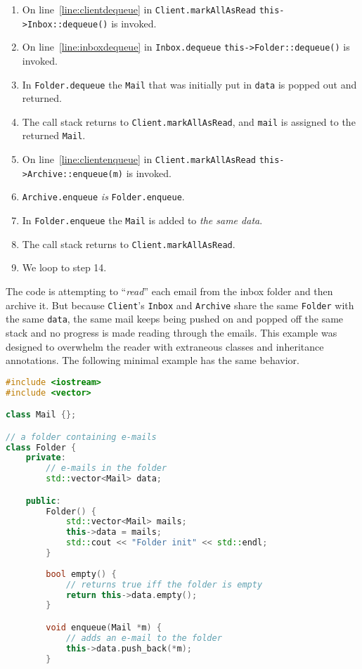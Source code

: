 \documentclass{article}
\begin{document}
\begin{example}
\begin{enumerate}
  \item On line~\ref{line:clientdequeue} in \texttt{Client.markAllAsRead} \texttt{this->Inbox::dequeue()} is invoked.
  \item On line~\ref{line:inboxdequeue} in \texttt{Inbox.dequeue} \texttt{this->Folder::dequeue()} is invoked.
  \item In \texttt{Folder.dequeue} the \texttt{Mail} that was initially put in \texttt{data} is popped out and returned.
  \item The call stack returns to \texttt{Client.markAllAsRead}, and \texttt{mail} is assigned to the returned \texttt{Mail}.
  \item On line~\ref{line:clientenqueue} in \texttt{Client.markAllAsRead} \texttt{this->Archive::enqueue(m)} is invoked.
  \item \texttt{Archive.enqueue} \textit{is} \texttt{Folder.enqueue}.
  \item In \texttt{Folder.enqueue} the \texttt{Mail} is added to \textit{the same data}.
  \item The call stack returns to \texttt{Client.markAllAsRead}.
  \item We loop to step 14.
  \end{enumerate}
  The code is attempting to ``\textit{read}'' each email from the inbox folder and then archive it.
  But because \texttt{Client}'s \texttt{Inbox} and \texttt{Archive} share the same \texttt{Folder} with the same \texttt{data}, the same mail keeps being pushed on and popped off the same stack and no progress is made reading through the emails.
  This example was designed to overwhelm the reader with extraneous classes and inheritance annotations.
  The following minimal example has the same behavior.
\begin{lstlisting}[language=C++, escapechar=|]
#include <iostream>
#include <vector>

class Mail {};

// a folder containing e-mails
class Folder {
    private:
        // e-mails in the folder
        std::vector<Mail> data;

    public:
        Folder() {
            std::vector<Mail> mails;
            this->data = mails;
            std::cout << "Folder init" << std::endl;
        }
    
        bool empty() {
            // returns true iff the folder is empty
            return this->data.empty();
        } 

        void enqueue(Mail *m) {
            // adds an e-mail to the folder
            this->data.push_back(*m);
        }


\end{lstlisting}
\end{example}
\end{document}
